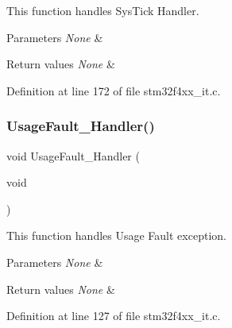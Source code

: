 This function handles Sys\+Tick Handler. 


\begin{DoxyParams}{Parameters}
{\em None} & \\
\hline
\end{DoxyParams}

\begin{DoxyRetVals}{Return values}
{\em None} & \\
\hline
\end{DoxyRetVals}


Definition at line 172 of file stm32f4xx\+\_\+it.\+c.

\mbox{\label{group___templates_ga1d98923de2ed6b7309b66f9ba2971647}} 
\subsubsection{\texorpdfstring{Usage\+Fault\+\_\+\+Handler()}{UsageFault\_Handler()}}
{\footnotesize\ttfamily void Usage\+Fault\+\_\+\+Handler (\begin{DoxyParamCaption}\item[{void}]{ }\end{DoxyParamCaption})}



This function handles Usage Fault exception. 


\begin{DoxyParams}{Parameters}
{\em None} & \\
\hline
\end{DoxyParams}

\begin{DoxyRetVals}{Return values}
{\em None} & \\
\hline
\end{DoxyRetVals}


Definition at line 127 of file stm32f4xx\+\_\+it.\+c.

